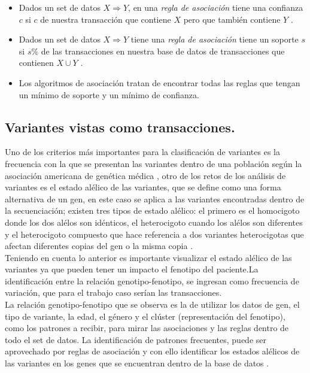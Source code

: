 \begin{itemize}
	\item Dados un set de datos $X \Rightarrow Y$, en una \textit{regla de asociación} tiene una confianza $c$ si $c$ de nuestra transacción que contiene $X$ pero que también contiene $Y$ \cite{Agrawal1994}.
	
	\item Dados un set de datos $X \Rightarrow Y$ tiene una \textit{regla de asociación} tiene un soporte $s$ si $s\%$ de las transacciones en nuestra base de datos de transacciones que contienen $X\cup Y$ \cite{Agrawal1994}. 
	
	\item Los algoritmos de asociación tratan de encontrar todas las reglas que tengan un mínimo de soporte y un mínimo de confianza\cite{Agrawal1994}. 

\end{itemize}

\subsection{Variantes vistas como transacciones.}

Uno de los criterios más importantes para la clasificación de variantes es la frecuencia con la que se presentan las variantes dentro de una población según la asociación americana de genética médica \cite{Laboratories2015}, otro de los retos de los análisis de variantes es el estado alélico de las variantes, que se define como una forma alternativa de un gen, en este caso se aplica a las variantes encontradas dentro de la secuenciación; existen tres tipos de estado alélico: el primero es el homocigoto donde los dos alélos son idénticos, el heterocigoto cuando los alélos son diferentes y el heterocigoto compuesto que hace referencia a dos variantes heterocigotas que afectan diferentes copias del gen o la misma copia \cite{Klug2013,Compound2012}.\\

Teniendo en cuenta lo anterior es importante visualizar el estado alélico de las variantes \cite{Hannah-Shmouni2015,Laboratories2015} ya que pueden tener un impacto el fenotipo del paciente.La identificación entre la relación genotipo-fenotipo, se ingresan como frecuencia de variación, que para el trabajo caso serían las transacciones\cite{Breuer2017}.\\

La relación genotipo-fenotipo que se observa es  la de utilizar los datos de gen, el tipo de variante, la edad, el género y el clúster (representación del fenotipo), como los patrones a recibir, para mirar las asociaciones y las reglas dentro de todo el set de datos. La identificación de patrones frecuentes, puede ser aprovechado por reglas de asociación y con ello identificar los estados alélicos de las variantes en los genes que se encuentran dentro de la base de datos \cite{breuler2017}.\\

